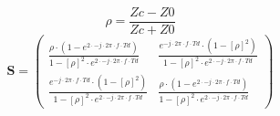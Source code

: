 \[ \rho =  \frac{ Zc-Z0 }{ Zc + Z0 } \]
\[ \mathbf{S} = \left(\begin{array}{cc}  \frac{ \rho \cdot \left( 1 -
e^{2 \cdot  -j \cdot 2 \pi \cdot f \cdot Td }  \right) }{ 1 - \left[
\rho \right]^2 \cdot e^{2 \cdot  -j \cdot 2 \pi \cdot f \cdot Td }  }
&  \frac{ e^{ -j \cdot 2 \pi \cdot f \cdot Td} \cdot \left( 1 - \left[
\rho \right] ^2 \right) }{ 1 - \left[ \rho \right]^2 \cdot e^{2 \cdot
-j \cdot 2 \pi \cdot f \cdot Td }  }  \\  \frac{ e^{ -j \cdot 2 \pi
\cdot f \cdot Td} \cdot \left( 1 - \left[ \rho \right] ^2 \right) }{ 1
- \left[ \rho \right]^2 \cdot e^{2 \cdot  -j \cdot 2 \pi \cdot f \cdot
Td }  }  &  \frac{ \rho \cdot \left( 1 - e^{2 \cdot  -j \cdot 2 \pi
\cdot f \cdot Td }  \right) }{ 1 - \left[ \rho \right]^2 \cdot e^{2
\cdot  -j \cdot 2 \pi \cdot f \cdot Td }  } \end{array}\right) \]

